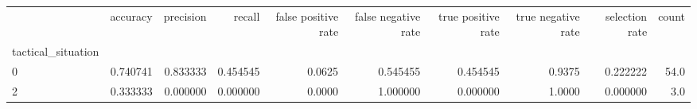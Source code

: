 \begin{tabular}{lrrrrrrrrr}
\toprule
{} &  accuracy &  precision &    recall &  false positive rate &  false negative rate &  true positive rate &  true negative rate &  selection rate &  count \\
tactical\_situation &           &            &           &                      &                      &                     &                     &                 &        \\
\midrule
0                  &  0.740741 &   0.833333 &  0.454545 &               0.0625 &             0.545455 &            0.454545 &              0.9375 &        0.222222 &   54.0 \\
2                  &  0.333333 &   0.000000 &  0.000000 &               0.0000 &             1.000000 &            0.000000 &              1.0000 &        0.000000 &    3.0 \\
\bottomrule
\end{tabular}
